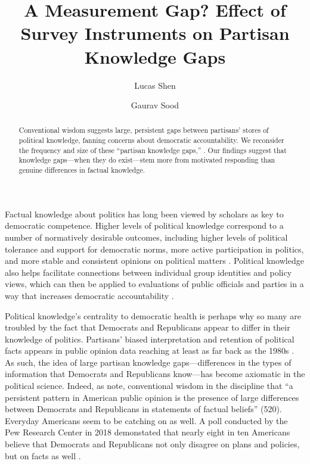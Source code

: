 \documentclass[12pt, letterpaper]{article}
\title{A Measurement Gap? Effect of Survey Instruments on Partisan Knowledge Gaps}
\author{Lucas Shen \and Gaurav Sood}
\begin{document}
\maketitle
\thispagestyle{empty}

\begin{abstract}

\noindent Conventional wisdom suggests large, persistent gaps between partisans' stores of political knowledge, fanning concerns about democratic accountability. We reconsider the frequency and size of these ``partisan knowledge gaps,'' . Our findings suggest that knowledge gaps---when they do exist---stem more from motivated responding than genuine differences in factual knowledge.

\end{abstract}

\vspace{.2in}

\newpage

\doublespacing

Factual knowledge about politics has long been viewed by scholars as key to democratic competence. Higher levels of political knowledge correspond to a number of normatively desirable outcomes, including higher levels of political tolerance and support for democratic norms, more active participation in politics, and more stable and consistent opinions on political matters \citep{Converse1964,dellicarpini,galston_2001}. Political knowledge also helps facilitate connections between individual group identities and policy views, which can then be applied to evaluations of public officials and parties in a way that increases democratic accountability \citep{dellicarpini}.

Political knowledge's centrality to democratic health is perhaps why so many are troubled by the fact that Democrats and Republicans appear to differ in their knowledge of politics. Partisans' biased interpretation and retention of political facts appears in public opinion data reaching at least as far back as the 1980s \citep[e.g.,][]{bartels_2002,jerit2012partisan}. As such, the idea of large partisan knowledge gaps---differences in the types of information that Democrats and Republicans know---has become axiomatic in the political science. Indeed, as \citet{bullocketal_2015} note, conventional wisdom in the discipline that ``a persistent pattern in American public opinion is the presence of large differences between Democrats and Republicans in statements of factual beliefs'' (520). Everyday Americans seem to be catching on as well. A poll conducted by the Pew Research Center in 2018 demonstated that nearly eight in ten Americans believe that Democrats and Republicans not only disagree on plans and policies, but on facts as well \citep{pew2018disagree}. 
\end{document}
